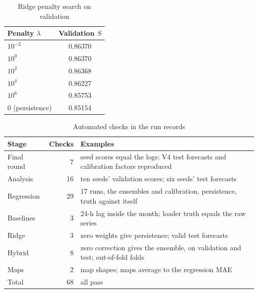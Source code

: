 \documentclass[journal]{IEEEtran}
\begin{document}
\begin{table}[H]
\centering
\caption{Ridge penalty search on validation}
\label{tab:ridgegrid}
\begin{tabular}{@{}lc@{}}
\toprule
Penalty $\lambda$ & Validation $S$ \\
\midrule
$10^{-2}$ & 0.86370 \\
$10^{0}$ & 0.86370 \\
$10^{2}$ & 0.86368 \\
$10^{4}$ & 0.86227 \\
$10^{6}$ & 0.85753 \\
0 (persistence) & 0.85154 \\
\bottomrule
\end{tabular}
\end{table}

\begin{table}[H]
\centering
\caption{Automated checks in the run records}
\label{tab:checks}
\setlength{\tabcolsep}{3pt}
\begin{tabular}{@{}lrp{}@{}}
\toprule
Stage & Checks & Examples \\
\midrule
Final round & 7 & seed scores equal the logs; V4 test forecasts and calibration factors reproduced \\
Analysis & 16 & ten seeds' validation scores; six seeds' test forecasts \\
Regression & 29 & 17 runs, the ensembles and calibration, persistence, truth against itself \\
Baselines & 3 & 24-h lag inside the month; loader truth equals the raw series \\
Ridge & 3 & zero weights give persistence; valid test forecasts \\
Hybrid & 8 & zero correction gives the ensemble, on validation and test; out-of-fold folds \\
Maps & 2 & map shapes; maps average to the regression MAE \\
\midrule
Total & 68 & all pass \\
\bottomrule
\end{tabular}
\end{table}
\end{document}
